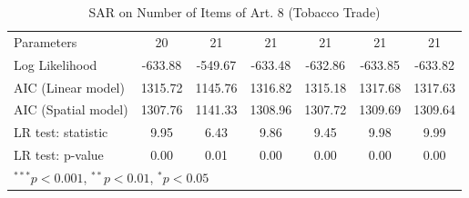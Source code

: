 \begin{table}[!h]
\begin{center}
\begin{tabular}{l c c c c c c }
Parameters              & 20           & 21           & 21           & 21           & 21           & 21           \\
Log Likelihood          & -633.88      & -549.67      & -633.48      & -632.86      & -633.85      & -633.82      \\
AIC (Linear model)      & 1315.72      & 1145.76      & 1316.82      & 1315.18      & 1317.68      & 1317.63      \\
AIC (Spatial model)     & 1307.76      & 1141.33      & 1308.96      & 1307.72      & 1309.69      & 1309.64      \\
LR test: statistic      & 9.95         & 6.43         & 9.86         & 9.45         & 9.98         & 9.99         \\
LR test: p-value        & 0.00         & 0.01         & 0.00         & 0.00         & 0.00         & 0.00         \\
\bottomrule
\multicolumn{7}{l}{\scriptsize{$^{***}p<0.001$, $^{**}p<0.01$, $^*p<0.05$}}
\end{tabular}
\caption{SAR on Number of Items of Art. 8 (Tobacco Trade)}
\label{table:coefficients}
\end{center}
\end{table}
